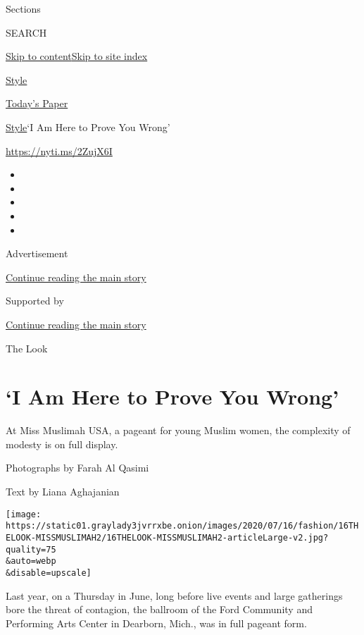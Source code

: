 Sections

SEARCH

\protect\hyperlink{site-content}{Skip to
content}\protect\hyperlink{site-index}{Skip to site index}

\href{https://www.nytimes3xbfgragh.onion/section/style}{Style}

\href{https://myaccount.nytimes3xbfgragh.onion/auth/login?response_type=cookie\&client_id=vi}{}

\href{https://www.nytimes3xbfgragh.onion/section/todayspaper}{Today's
Paper}

\href{/section/style}{Style}\textbar{}`I Am Here to Prove You Wrong'

\url{https://nyti.ms/2ZujX6I}

\begin{itemize}
\item
\item
\item
\item
\item
\end{itemize}

Advertisement

\protect\hyperlink{after-top}{Continue reading the main story}

Supported by

\protect\hyperlink{after-sponsor}{Continue reading the main story}

The Look

\hypertarget{i-am-here-to-prove-you-wrong}{%
\section{`I Am Here to Prove You
Wrong'}\label{i-am-here-to-prove-you-wrong}}

At Miss Muslimah USA, a pageant for young Muslim women, the complexity
of modesty is on full display.

Photographs by Farah Al Qasimi

Text by Liana Aghajanian

\texttt{[image: https://static01.graylady3jvrrxbe.onion/images/2020/07/16/fashion/16THELOOK-MISSMUSLIMAH2/16THELOOK-MISSMUSLIMAH2-articleLarge-v2.jpg?quality=75\\\&auto=webp\\\&disable=upscale]}

Last year, on a Thursday in June, long before live events and large
gatherings bore the threat of contagion, the ballroom of the Ford
Community and Performing Arts Center in Dearborn, Mich., was in full
pageant form.

